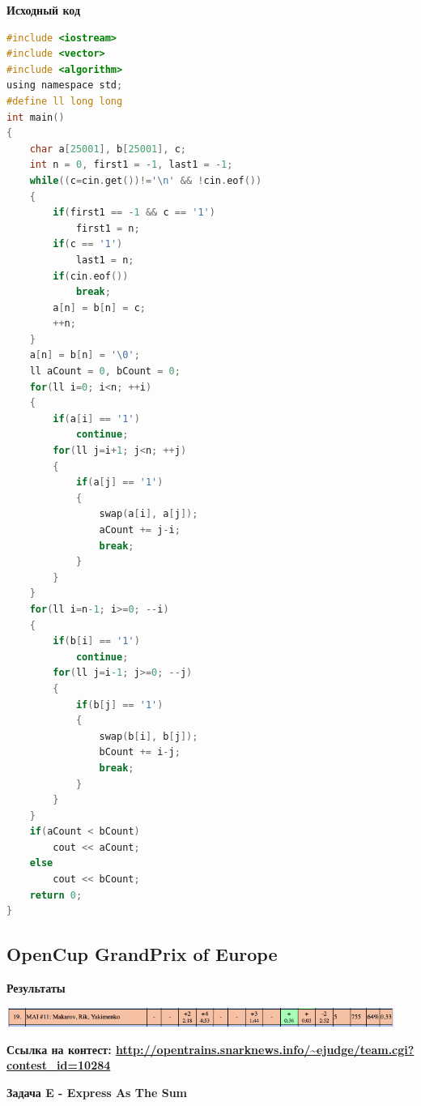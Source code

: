 \documentclass[a4paper,12pt]{article}
\begin{document}
\newpage
\textbf{{\large Исходный код}} \\
\begin{lstlisting}[language=C]
#include <iostream>
#include <vector>
#include <algorithm>
using namespace std;
#define ll long long
int main()
{
    char a[25001], b[25001], c;
    int n = 0, first1 = -1, last1 = -1;
    while((c=cin.get())!='\n' && !cin.eof())
    {
        if(first1 == -1 && c == '1')
            first1 = n;
        if(c == '1')
            last1 = n;
        if(cin.eof())
            break;
        a[n] = b[n] = c;
        ++n;
    }
    a[n] = b[n] = '\0';
    ll aCount = 0, bCount = 0;
    for(ll i=0; i<n; ++i)
    {
        if(a[i] == '1')
            continue;
        for(ll j=i+1; j<n; ++j)
        {
            if(a[j] == '1')
            {
                swap(a[i], a[j]);
                aCount += j-i;
                break;
            }
        }
    }
    for(ll i=n-1; i>=0; --i)
    {
        if(b[i] == '1')
            continue;
        for(ll j=i-1; j>=0; --j)
        {
            if(b[j] == '1')
            {
                swap(b[i], b[j]);
                bCount += i-j;
                break;
            }
        }
    }
    if(aCount < bCount)
        cout << aCount;
    else
        cout << bCount;
    return 0;
}
\end{lstlisting}



%
%
\newpage
\subsection{OpenCup GrandPrix of Europe}

\textbf{{\large Результаты}} \\
\begin{center}
\includegraphics[width=0.95\textwidth]{OC_Europe/OC_Europe_result.png}\\ [1cm]
\end{center}

\textbf{{\large Ссылка на контест: \url{http://opentrains.snarknews.info/~ejudge/team.cgi?contest_id=10284}}}

\newpage
\textbf{{\large Задача E - Express As The Sum}}
\end{document}
